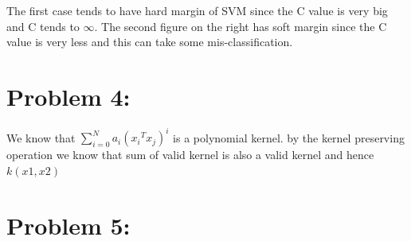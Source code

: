 \documentclass[5pt,a4paper]{article}
\begin{document}
The first case tends to have hard margin of SVM since the C value is very big and C tends to $\infty$. The second figure on the right has soft margin since the C value is very less and this can take some mis-classification.\\ 
	
	\section*{Problem 4:}
	We know that $ \sum_{i=0}^{N} a_i({x_i}^T {x_j})^i $ is a polynomial kernel. by the kernel preserving operation we know that sum of valid kernel is also a valid kernel and hence $k(x1,x2)$
	
	\section*{Problem 5:}
	
	
\end{document}
